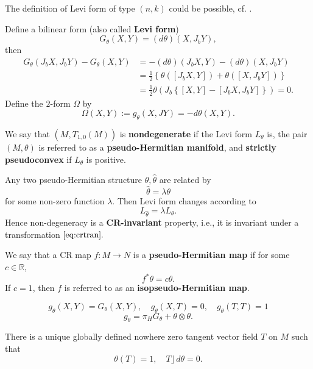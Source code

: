 \begin{remark}
The definition of Levi form of type $(n,k)$ could be possible, cf. \cite{dragomirDifferentialGeometryAnalysis2006}. 
\end{remark}

Define a bilinear form (also called \textbf{Levi form})
$$
\boxed{G_{\theta}(X, Y)=(d \theta)\left(X, J_{b} Y\right),}
$$
then
$$
\begin{aligned}
G_{\theta}\left(J_{b} X, J_{b} Y\right)-G_{\theta}(X, Y) & =-(d \theta)\left(J_{b} X, Y\right)-(d \theta)\left(X, J_{b} Y\right) \\
& =\frac{1}{2}\left\{\theta\left(\left[J_{b} X, Y\right]\right)+\theta\left(\left[X, J_{b} Y\right]\right)\right\} \\
& =\frac{1}{2} \theta\left(J_{b}\left\{[X, Y]-\left[J_{b} X, J_{b} Y\right]\right\}\right)=0.
\end{aligned}
$$
Define the $2$-form $\Omega$ by 
$$\boxed{\Omega(X,Y):=g_{\theta}(X,JY)=-d \theta (X,Y).} $$

\begin{definition}
    We say that $\left(M, T_{1,0}(M)\right)$ is \textbf{nondegenerate} if the Levi form $L_{\theta}$ is, the pair $(M, \theta)$ is referred to as a \textbf{pseudo-Hermitian manifold},
    and \textbf{strictly pseudoconvex} if $L_{\theta}$ is positive.
\end{definition}

\begin{remark}
Any two pseudo-Hermitian structure $\theta ,\hat{\theta }$ are related by 
\begin{equation}\label{eq:crtran}
    \hat{\theta }=\lambda \theta 
\end{equation}   
for some non-zero function $\lambda .$ Then Levi form changes according to 
$$ L_{\hat{\theta }}=\lambda L_{\theta }. $$ 
Hence non-degeneracy is a \textbf{CR-invariant} property, i.e., it is invariant under a transformation $\eqref{eq:crtran}.$ 
\end{remark}

\begin{definition}
    We say that a CR map $f: M \rightarrow N$ is a \textbf{pseudo-Hermitian map} if for some $c\in \mathbb{R}$,
    $$f^{*}\theta=c\theta. $$
    If $c=1$, then $f$ is referred to as an \textbf{isopseudo-Hermitian map}.
\end{definition}

\begin{definition}
    $$
g_{\theta}(X, Y)=G_{\theta}(X, Y), \quad g_{\theta}(X, T)=0, \quad g_{\theta}(T, T)=1
$$
$$
\boxed{g_{\theta}=\pi_{H} G_{\theta}+\theta \otimes \theta.}
$$
\end{definition}
\begin{proposition}
  There is a unique globally defined nowhere zero tangent vector field $T$ on $M$ such that
  $$ \theta (T)=1, \quad T \rfloor \, d \theta =0.
  $$
\end{proposition}



